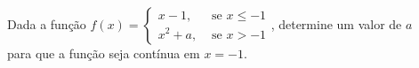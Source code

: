 \begin{frame}
  \begin{columns}[onlytextwidth]
    \begin{column}{0.7\textwidth}\vspace{-0.5cm}
      \begin{example}
        Dada a função $\displaystyle f(x) = \begin{cases}
          x-1,&\mbox{ se }x\leq -1 \\ x^{2}+a,&\mbox{ se }x > -1
        \end{cases}$, determine um valor de $a$ para que a função seja contínua em $x=-1$.
      \end{example}
    \end{column}
    \begin{column}{0.3\textwidth}\vspace{-0.5cm}
    \end{column}
  \end{columns}
\end{frame}
